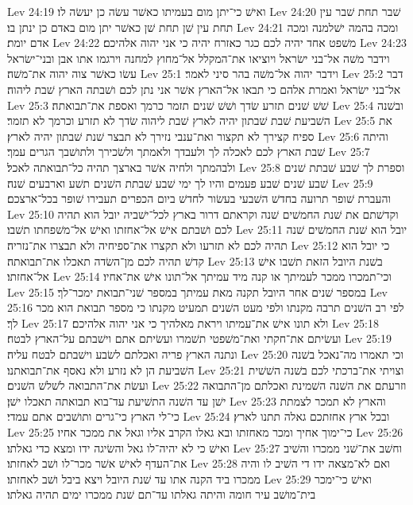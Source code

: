 Lev 24:19  ואישׁ כי־יתן מום בעמיתו כאשׁר עשׂה כן יעשׂה לו׃
Lev 24:20  שׁבר תחת שׁבר עין תחת עין שׁן תחת שׁן כאשׁר יתן מום באדם כן ינתן בו׃
Lev 24:21  ומכה בהמה ישׁלמנה ומכה אדם יומת׃
Lev 24:22  משׁפט אחד יהיה לכם כגר כאזרח יהיה כי אני יהוה אלהיכם׃
Lev 24:23  וידבר משׁה אל־בני ישׂראל ויוציאו את־המקלל אל־מחוץ למחנה וירגמו אתו אבן ובני־ישׂראל עשׂו כאשׁר צוה יהוה את־משׁה׃
Lev 25:1  וידבר יהוה אל־משׁה בהר סיני לאמר׃
Lev 25:2  דבר אל־בני ישׂראל ואמרת אלהם כי תבאו אל־הארץ אשׁר אני נתן לכם ושׁבתה הארץ שׁבת ליהוה׃
Lev 25:3  שׁשׁ שׁנים תזרע שׂדך ושׁשׁ שׁנים תזמר כרמך ואספת את־תבואתה׃
Lev 25:4  ובשׁנה השׁביעת שׁבת שׁבתון יהיה לארץ שׁבת ליהוה שׂדך לא תזרע וכרמך לא תזמר׃
Lev 25:5  את ספיח קצירך לא תקצור ואת־ענבי נזירך לא תבצר שׁנת שׁבתון יהיה לארץ׃
Lev 25:6  והיתה שׁבת הארץ לכם לאכלה לך ולעבדך ולאמתך ולשׂכירך ולתושׁבך הגרים עמך׃
Lev 25:7  ולבהמתך ולחיה אשׁר בארצך תהיה כל־תבואתה לאכל׃
Lev 25:8  וספרת לך שׁבע שׁבתת שׁנים שׁבע שׁנים שׁבע פעמים והיו לך ימי שׁבע שׁבתת השׁנים תשׁע וארבעים שׁנה׃
Lev 25:9  והעברת שׁופר תרועה בחדשׁ השׁבעי בעשׂור לחדשׁ ביום הכפרים תעבירו שׁופר בכל־ארצכם׃
Lev 25:10  וקדשׁתם את שׁנת החמשׁים שׁנה וקראתם דרור בארץ לכל־ישׁביה יובל הוא תהיה לכם ושׁבתם אישׁ אל־אחזתו ואישׁ אל־משׁפחתו תשׁבו׃
Lev 25:11  יובל הוא שׁנת החמשׁים שׁנה תהיה לכם לא תזרעו ולא תקצרו את־ספיחיה ולא תבצרו את־נזריה׃
Lev 25:12  כי יובל הוא קדשׁ תהיה לכם מן־השׂדה תאכלו את־תבואתה׃
Lev 25:13  בשׁנת היובל הזאת תשׁבו אישׁ אל־אחזתו׃
Lev 25:14  וכי־תמכרו ממכר לעמיתך או קנה מיד עמיתך אל־תונו אישׁ את־אחיו׃
Lev 25:15  במספר שׁנים אחר היובל תקנה מאת עמיתך במספר שׁני־תבואת ימכר־לך׃
Lev 25:16  לפי רב השׁנים תרבה מקנתו ולפי מעט השׁנים תמעיט מקנתו כי מספר תבואת הוא מכר לך׃
Lev 25:17  ולא תונו אישׁ את־עמיתו ויראת מאלהיך כי אני יהוה אלהיכם׃
Lev 25:18  ועשׂיתם את־חקתי ואת־משׁפטי תשׁמרו ועשׂיתם אתם וישׁבתם על־הארץ לבטח׃
Lev 25:19  ונתנה הארץ פריה ואכלתם לשׂבע וישׁבתם לבטח עליה׃
Lev 25:20  וכי תאמרו מה־נאכל בשׁנה השׁביעת הן לא נזרע ולא נאסף את־תבואתנו׃
Lev 25:21  וצויתי את־ברכתי לכם בשׁנה השׁשׁית ועשׂת את־התבואה לשׁלשׁ השׁנים׃
Lev 25:22  וזרעתם את השׁנה השׁמינת ואכלתם מן־התבואה ישׁן עד השׁנה התשׁיעת עד־בוא תבואתה תאכלו ישׁן׃
Lev 25:23  והארץ לא תמכר לצמתת כי־לי הארץ כי־גרים ותושׁבים אתם עמדי׃
Lev 25:24  ובכל ארץ אחזתכם גאלה תתנו לארץ׃
Lev 25:25  כי־ימוך אחיך ומכר מאחזתו ובא גאלו הקרב אליו וגאל את ממכר אחיו׃
Lev 25:26  ואישׁ כי לא יהיה־לו גאל והשׂיגה ידו ומצא כדי גאלתו׃
Lev 25:27  וחשׁב את־שׁני ממכרו והשׁיב את־העדף לאישׁ אשׁר מכר־לו ושׁב לאחזתו׃
Lev 25:28  ואם לא־מצאה ידו די השׁיב לו והיה ממכרו ביד הקנה אתו עד שׁנת היובל ויצא ביבל ושׁב לאחזתו׃
Lev 25:29  ואישׁ כי־ימכר בית־מושׁב עיר חומה והיתה גאלתו עד־תם שׁנת ממכרו ימים תהיה גאלתו׃
